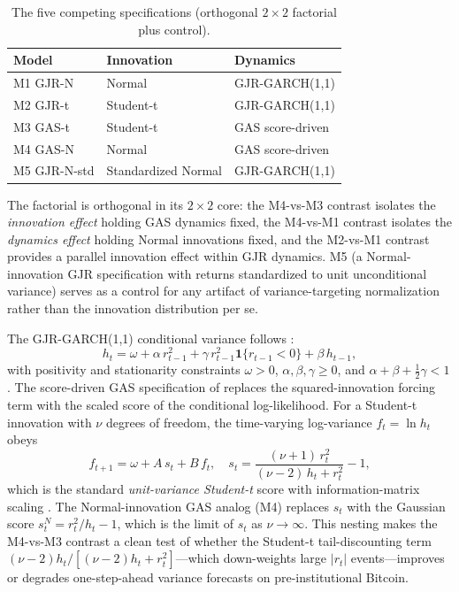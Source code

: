 \begin{table}[htbp]
\centering
\caption{The five competing specifications (orthogonal $2\times2$ factorial plus control).}
\label{tab:models}
\begin{tabular}{lll}
\toprule
Model & Innovation & Dynamics \\
\midrule
M1 GJR-N     & Normal              & GJR-GARCH(1,1) \\
M2 GJR-t     & Student-t           & GJR-GARCH(1,1) \\
M3 GAS-t     & Student-t           & GAS score-driven \\
M4 GAS-N     & Normal              & GAS score-driven \\
M5 GJR-N-std & Standardized Normal & GJR-GARCH(1,1) \\
\bottomrule
\end{tabular}
\end{table}

The factorial is orthogonal in its $2\times2$ core: the M4-vs-M3 contrast isolates the \emph{innovation effect} holding GAS dynamics fixed, the M4-vs-M1 contrast isolates the \emph{dynamics effect} holding Normal innovations fixed, and the M2-vs-M1 contrast provides a parallel innovation effect within GJR dynamics. M5 (a Normal-innovation GJR specification with returns standardized to unit unconditional variance) serves as a control for any artifact of variance-targeting normalization rather than the innovation distribution per se.

The GJR-GARCH(1,1) conditional variance follows \citet{glosten1993}:
\begin{equation}
h_t = \omega + \alpha\, r_{t-1}^2 + \gamma\, r_{t-1}^2 \mathbf{1}\{r_{t-1} < 0\} + \beta\, h_{t-1},
\end{equation}
with positivity and stationarity constraints $\omega>0$, $\alpha,\beta,\gamma \geq 0$, and $\alpha + \beta + \tfrac{1}{2}\gamma < 1$. The score-driven GAS specification of \citet{creal2013} replaces the squared-innovation forcing term with the scaled score of the conditional log-likelihood. For a Student-t innovation with $\nu$ degrees of freedom, the time-varying log-variance $f_t = \ln h_t$ obeys
\begin{equation}
f_{t+1} = \omega + A\, s_t + B\, f_t, \quad s_t = \frac{(\nu+1)\, r_t^2}{(\nu - 2)\, h_t + r_t^2} - 1,
\end{equation}
which is the standard \emph{unit-variance Student-t} score with information-matrix scaling \citep[eq.~4--5]{creal2013}. The Normal-innovation GAS analog (M4) replaces $s_t$ with the Gaussian score $s_t^{N} = r_t^2 / h_t - 1$, which is the limit of $s_t$ as $\nu \to \infty$. This nesting makes the M4-vs-M3 contrast a clean test of whether the Student-t tail-discounting term $(\nu - 2) h_t / [(\nu - 2) h_t + r_t^2]$---which down-weights large $|r_t|$ events---improves or degrades one-step-ahead variance forecasts on pre-institutional Bitcoin.

